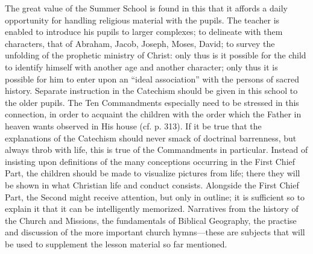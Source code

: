 The great value of the Summer School is found in this that it affords a daily opportunity for handling religious material with the pupils. The teacher is enabled to introduce his pupils to larger complexes; to delineate with them characters,
that of Abraham, Jacob, Joseph, Moses, David; to survey the unfolding of the prophetic ministry of Christ: only thus is it possible for the child to identify himself with another age and another character; only thus it is possible for him to enter upon an “ideal association” with the persons of sacred history. Separate instruction in the Catechism should be given in this school to the older pupils. The Ten Commandments especially need to be stressed in this connection, in order to acquaint the children with the order which the Father in heaven wants observed in His house (cf. p. 313). If it be true that the explanations of the Catechism should never smack of doctrinal barrenness, but always throb with life, this is true of the Commandments in particular. Instead of insisting upon definitions of the many conceptions occurring in the First Chief Part, the children should be made to visualize pictures from life; there they will be shown in what Christian life and conduct consists. Alongside the First Chief Part, the Second might receive attention, but only in outline; it is sufficient so to explain it that it can be intelligently memorized. Narratives from the history of the Church and Missions, the fundamentals of Biblical Geography, the practise and discussion of the more important church hymns—these are subjects that will be used to supplement the lesson material so far mentioned.

